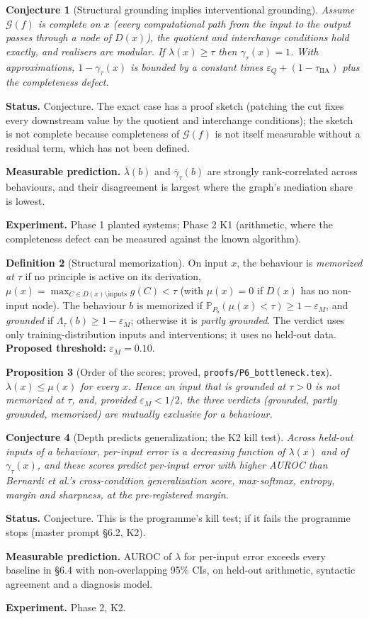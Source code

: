 \documentclass[11pt]{article}
\theoremstyle{definition}
\newtheorem{definition}{Definition}[section]
\theoremstyle{plain}
\newtheorem{proposition}[definition]{Proposition}
\newtheorem{conjecture}[definition]{Conjecture}
\theoremstyle{remark}
\renewcommand{\Pr}{\mathbb{P}}
\newcommand{\G}{\mathcal{G}}
\newcommand{\IIA}{\mathrm{IIA}}
\newcommand{\status}[1]{\par\noindent\textbf{Status.} #1}
\newcommand{\predict}[1]{\par\noindent\textbf{Measurable prediction.} #1}
\newcommand{\experiment}[1]{\par\noindent\textbf{Experiment.} #1\par\medskip}
\begin{document}
\begin{conjecture}[Structural grounding implies interventional grounding]
\label{conj:gamma}
Assume $\G(f)$ is \emph{complete} on $x$ (every computational path from the
input to the output passes through a node of $D(x)$), the quotient and
interchange conditions hold exactly, and realisers are modular. If
$\lambda(x)\ge\tau$ then $\gamma_\tau(x)=1$. With approximations,
$1-\gamma_\tau(x)$ is bounded by a constant times
$\varepsilon_Q+(1-\tau_{\IIA})$ plus the completeness defect.
\end{conjecture}
\status{Conjecture. The exact case has a proof sketch (patching the cut fixes
every downstream value by the quotient and interchange conditions); the
sketch is not complete because completeness of $\G(f)$ is not itself
measurable without a residual term, which has not been defined.}
\predict{$\bar\lambda(b)$ and $\bar\gamma_\tau(b)$ are strongly rank-correlated
across behaviours, and their disagreement is largest where the graph's
mediation share is lowest.}
\experiment{Phase 1 planted systems; Phase 2 K1 (arithmetic, where the
completeness defect can be measured against the known algorithm).}

\begin{definition}[Structural memorization]\label{def:memo}
On input $x$, the behaviour is \emph{memorized at $\tau$} if no principle is
active on its derivation, $\mu(x)=\max_{C\in D(x)\setminus\text{inputs}}g(C)<\tau$
(with $\mu(x)=0$ if $D(x)$ has no non-input node). The behaviour $b$ is
memorized if $\Pr_{P_b}(\mu(x)<\tau)\ge1-\varepsilon_M$, and \emph{grounded} if
$\Lambda_\tau(b)\ge1-\varepsilon_M$; otherwise it is \emph{partly grounded}.
The verdict uses only training-distribution inputs and interventions; it uses
no held-out data. \textbf{Proposed threshold:} $\varepsilon_M=0.10$.
\end{definition}

\begin{proposition}[Order of the scores; proved,
\texttt{proofs/P6\_bottleneck.tex}]\label{prop:order}
$\lambda(x)\le\mu(x)$ for every $x$. Hence an input that is grounded at
$\tau>0$ is not memorized at $\tau$, and, provided $\varepsilon_M<1/2$, the
three verdicts (grounded, partly grounded, memorized) are mutually exclusive
for a behaviour.
\end{proposition}

\begin{conjecture}[Depth predicts generalization; the K2 kill test]
\label{conj:k2}
Across held-out inputs of a behaviour, per-input error is a decreasing
function of $\lambda(x)$ and of $\gamma_\tau(x)$, and these scores predict
per-input error with higher AUROC than Bernardi et al.'s cross-condition
generalization score, max-softmax, entropy, margin and sharpness, at the
pre-registered margin.
\end{conjecture}
\status{Conjecture. This is the programme's kill test; if it fails the
programme stops (master prompt \S6.2, K2).}
\predict{AUROC of $\lambda$ for per-input error exceeds every baseline in
\S6.4 with non-overlapping 95\% CIs, on held-out arithmetic, syntactic
agreement and a diagnosis model.}
\experiment{Phase 2, K2.}
\end{document}
